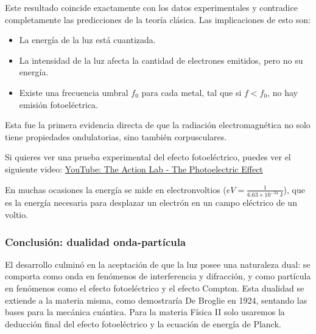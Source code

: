 Este resultado coincide exactamente con los datos experimentales y contradice completamente las predicciones de la teoría clásica. Las implicaciones de esto son:

\begin{itemize}
  \item La energía de la luz está cuantizada.
  \item La intensidad de la luz afecta la cantidad de electrones emitidos, pero no su energía.
  \item Existe una frecuencia umbral \(f_0\) para cada metal, tal que si \(f < f_0\), no hay emisión fotoeléctrica.
\end{itemize}

Esta fue la primera evidencia directa de que la radiación electromagnética no solo tiene propiedades ondulatorias, sino también corpusculares.

Si quieres ver una prueba experimental del efecto fotoeléctrico, puedes ver el siguiente video: \href{https://youtu.be/oYnp0WZDhYQ?si=kIBH75DIIDv5hg_4}{YouTube: The Action Lab - The Photoelectric Effect}

\begin{tcolorbox}[myconclusion]
  En muchas ocasiones la energía se mide en electronvoltios (\(eV = \frac{1}{6.63 \times 10^{-34} \ \text{J}}\)), que es la energía necesaria para desplazar un electrón en un campo eléctrico de un voltio.
\end{tcolorbox}

\subsubsection{Conclusión: dualidad onda-partícula}

El desarrollo culminó en la aceptación de que la luz posee una naturaleza dual: se comporta como onda en fenómenos de interferencia y difracción, y como partícula en fenómenos como el efecto fotoeléctrico y el efecto Compton. Esta dualidad se extiende a la materia misma, como demostraría De Broglie en 1924, sentando las bases para la mecánica cuántica. Para la materia Física II solo usaremos la deducción final del efecto fotoeléctrico y la ecuación de energía de Planck.